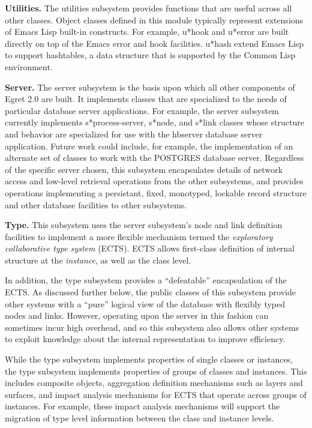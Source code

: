 \begin{itemizenoindent}
  
\item {\bf Utilities.} The utilities subsystem provides functions
  that are useful across all other classes. Object classes defined in this
  module typically represent extensions of Emacs Lisp built-in constructs.
  For example, {\sf u*hook\/} and {\sf u*error\/} are built directly on top
  of the Emacs error and hook facilities. {\sf u*hash\/} extend Emacs Lisp
  to support hashtables, a data structure that is supported by the Common
  Lisp environment. 
  
\item {\bf Server.} The server subsystem is the basis upon which all
  other components of Egret 2.0 are built.  It implements classes that
  are specialized to the needs of particular database server
  applications.  For example, the server subsystem currently implements
  {\sf s*process-server}, {\sf s*node}, and {\sf s*link} classes whose
  structure and behavior are specialized for use with the hbserver
  database server application.  Future work could include, for example,
  the implementation of an alternate set of classes to work with the
  POSTGRES database server. Regardless of the specific server chosen,
  this subsystem encapsulates details of network access and low-level
  retrieval operations from the other subsystems, and provides
  operations implementing a persistant, fixed, monotyped, lockable
  record structure and other database facilities to other subsystems.
  
\item {\bf Type.} This subsystem uses the server subsystem's node
  and link definition facilities to implement a more flexible mechanism
  termed the {\em exploratory collaborative type system} (ECTS).  ECTS
  allows first-class definition of internal structure at the {\em
  instance}, as well as the class level.  
  
  In addition, the type subsystem provides a ``defeatable''
  encapsulation of the ECTS.  As discussed further below, the public
  classes of this subsystem provide other systems with a ``pure''
  logical view of the database with flexibly typed nodes and links.
  However, operating upon the server in this fashion can sometimes
  incur high overhead, and so this subsystem also allows other systems
  to exploit knowledge about the internal representation to improve
  efficiency.
  
  While the type subsystem implements properties of single classes
  or instances, the type subsystem implements properties of groups
  of classes and instances.  This includes composite objects,
  aggregation definition mechanisms such as layers and surfaces, and
  impact analysis mechanisms for ECTS that operate across groups of
  instances.  For example, these impact analysis mechanisms will
  support the migration of type level information between the class
  and instance levels.
  

\end{itemizenoindent}
